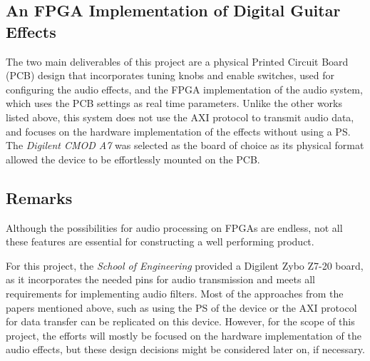 \subsection[]{An FPGA Implementation of Digital Guitar Effects\cite{california}}
The two main deliverables of this project are a physical Printed Circuit Board (PCB) design that incorporates tuning knobs and enable switches, used for configuring the audio effects, and the FPGA implementation of the audio system, which uses the PCB settings as real time parameters. Unlike the other works listed above, this system does not use the AXI protocol to transmit audio data, and focuses on the hardware implementation of the effects without using a PS. The \textit{Digilent CMOD A7} was selected as the board of choice as its physical format allowed the device to be effortlessly mounted on the PCB.

\subsection{Remarks}

Although the possibilities for audio processing on FPGAs are endless, not all these features are essential for constructing a well performing product. 

For this project, the \textit{School of Engineering} provided a Digilent Zybo Z7-20 board, as it incorporates the needed pins for audio transmission and meets all requirements for implementing audio filters. Most of the approaches from the papers mentioned above, such as using the PS of the device or the AXI protocol for data transfer can be replicated on this device. However, for the scope of this project, the efforts will mostly be focused on the hardware implementation of the audio effects, but these design decisions might be considered later on, if necessary.